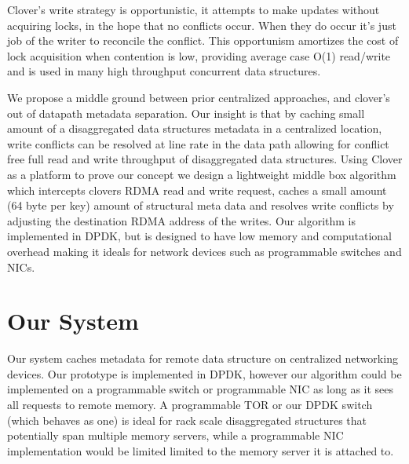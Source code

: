 Clover's write strategy is opportunistic, it attempts to make updates
without acquiring locks, in the hope that no conflicts occur. When
they do occur it's just job of the writer to reconcile the conflict.
This opportunism amortizes the cost of lock acquisition when
contention is low, providing average case O(1) read/write and is used
in many high throughput concurrent data structures.

We propose a middle ground between prior centralized approaches, and
clover's out of datapath metadata separation. Our insight is that by
caching small amount of a disaggregated data structures metadata in a
centralized location, write conflicts can be resolved at line rate in
the data path allowing for conflict free full read and write
throughput of disaggregated data structures. Using Clover as a
platform to prove our concept we design a lightweight middle box
algorithm which intercepts clovers RDMA read and write request, caches
a small amount (64 byte per key) amount of structural meta data and
resolves write conflicts by adjusting the destination RDMA address of
the writes. Our algorithm is implemented in DPDK, but is designed to
have low memory and computational overhead making it ideals for
network devices such as programmable switches and NICs.



\section{Our System}

Our system caches metadata for remote data structure on centralized
networking devices. Our prototype is implemented in DPDK, however our
algorithm could be implemented on a programmable switch or
programmable NIC as long as it sees all requests to remote memory. 
A programmable TOR or our DPDK switch (which behaves as one) is ideal
for rack scale disaggregated structures that potentially span multiple
memory servers, while a programmable NIC implementation would be
limited limited to the memory server it is attached to. 


